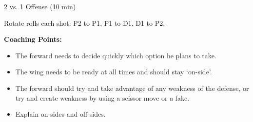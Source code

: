 \begin{evenBlock}{2 vs. 1 Offense (10 min)}
\begin{minipage}[t]{\linewidth}
\begin{minipage}{.6\linewidth}
        \vspace{3pt}
        
        Rotate rolls each shot: P2 to P1, P1 to D1, D1 to P2.

        \vspace{10pt}
        
        \textbf{Coaching Points:}
        \begin{itemize}
        \setlength{\itemsep}{0pt}
        \setlength{\parskip}{0pt}
        \setlength{\parsep}{0pt}
        \item The forward needs to decide quickly which option he plans to take.
        \item The wing needs to be ready at all times and should stay `on-side'.
        \item The forward should try and take advantage of any weakness of the defense, or try and create weakness by using a scissor move or a fake.
        \item Explain on-sides and off-sides.
        \end{itemize}

    \end{minipage}
\end{minipage}

\end{evenBlock}